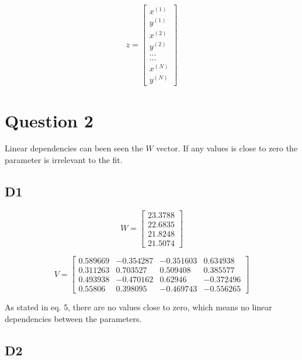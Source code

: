 \begin{equation}
z=\begin{bmatrix} { x }^{ \left( 1 \right)  } \\ y^{ \left( 1 \right)  } \\ { x }^{ \left( 2 \right)  } \\ { y }^{ \left( 2 \right)  } \\ ... \\ ... \\ { x }^{ \left( N \right)  } \\ { y }^{ \left( N \right)  } \end{bmatrix}
\label{eq:} 
\end{equation}

\section*{Question 2}
Linear dependencies can been seen the $W$ vector. If any values is close to zero the parameter is irrelevant to the fit. 
\subsection*{D1}

\begin{equation}
W=\begin{bmatrix} 23.3788 \\ 22.6835 \\ 21.8248 \\ 21.5074  \end{bmatrix}
\label{eq:} 
\end{equation}

\begin{equation}
V=\begin{bmatrix}  0.589669 & -0.354287 & -0.351603 & 0.634938 \\
0.311263 & 0.703527 & 0.509408 & 0.385577 \\
0.493938 & -0.470162 & 0.62946 & -0.372496 \\
0.55806 & 0.398095 & -0.469743 & -0.556265  \end{bmatrix}
\label{eq:} 
\end{equation}

As stated in eq. 5, there are no values close to zero, which means no linear dependencies between the parameters. 

\subsection*{D2}

